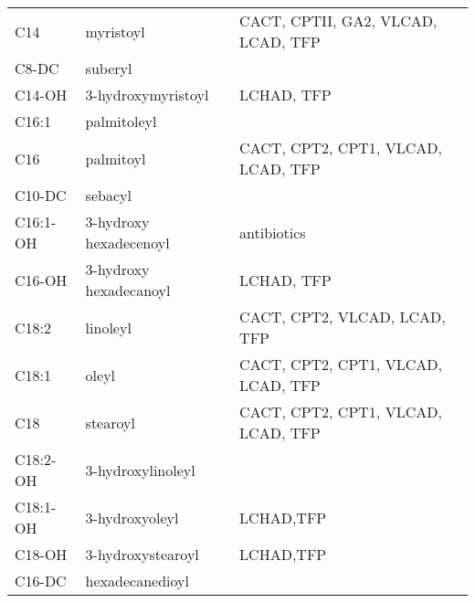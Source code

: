 \documentclass[12pt]{scrartcl}
\begin{document}
\begin{table}[htbp]
\begin{tabular}{lll}
C14 & myristoyl & CACT, CPTII, GA2, VLCAD, LCAD, TFP\\
C8-DC & suberyl & \\
C14-OH & 3-hydroxymyristoyl & LCHAD, TFP\\
C16:1 & palmitoleyl & \\
C16 & palmitoyl & CACT, CPT2, CPT1, VLCAD, LCAD, TFP\\
C10-DC & sebacyl & \\
C16:1-OH & 3-hydroxy hexadecenoyl & antibiotics\\
C16-OH & 3-hydroxy hexadecanoyl & LCHAD, TFP\\
C18:2 & linoleyl & CACT, CPT2, VLCAD, LCAD, TFP\\
C18:1 & oleyl & CACT, CPT2, CPT1, VLCAD, LCAD, TFP\\
C18 & stearoyl & CACT, CPT2, CPT1, VLCAD, LCAD, TFP\\
C18:2-OH & 3-hydroxylinoleyl & \\
C18:1-OH & 3-hydroxyoleyl & LCHAD,TFP\\
C18-OH & 3-hydroxystearoyl & LCHAD,TFP\\
C16-DC & hexadecanedioyl & \\
\end{tabular}
\end{table}
\end{document}
